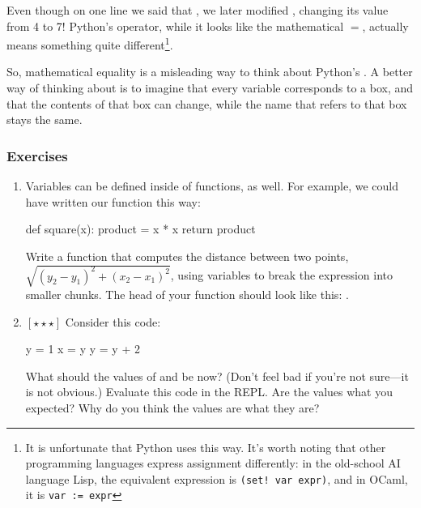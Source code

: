 \documentclass{article}
\newcommand\pyi\pythoninline
\newcommand\hardest{$[\star\star\star]$ }
\newcounter{exercisei}
\newenvironment{exercises}{
\subsubsection*{Exercises}
\begin{enumerate} 
\setcounter{enumi}{\value{exercisei}}
}{
\setcounter{exercisei}{\value{enumi}}
\end{enumerate}
\clearpage
}
\begin{document}
\noindent Even though on one line we said that \pyi{y = x + 2}, we later modified \pyi{y}, changing its value from 4 to 7! Python's \pyi{=} operator, while it looks like the mathematical $=$, actually means something quite different\footnote{It is unfortunate that Python uses \pyi{=} this way. It's worth noting that other programming languages express assignment differently: in the old-school AI language Lisp, the equivalent expression is {\tt (set! var expr)}, and in OCaml, it is {\tt var := expr}}.

So, mathematical equality is a misleading way to think about Python's \pyi{=}. A better way of thinking about \pyi{=} is to imagine that every variable corresponds to a box, and that the contents of that box can change, while the name that refers to that box stays the same.

\begin{exercises}
\item Variables can be defined inside of functions, as well. For example, we could have written our \pyi{square} function this way:

\begin{python}
def square(x):
    product = x * x
    return product
\end{python}

Write a function that computes the distance between two points, \\$\sqrt{(y_2-y_1)^2 + (x_2-x_1)^2}$, using variables to break the expression into smaller chunks. The head of your function should look like this: \pyi{def dist(x1, y1, x2, y2):}.

\item \label{exer:assign}\hardest Consider this code:
\begin{python}
y = 1
x = y
y = y + 2
\end{python}
\noindent What should the values of \pyi{x} and \pyi{y} be now? (Don't feel bad if you're not sure---it is not obvious.) Evaluate this code in the REPL. Are the values what you expected? Why do you think the values are what they are?
\end{exercises}

\end{document}
